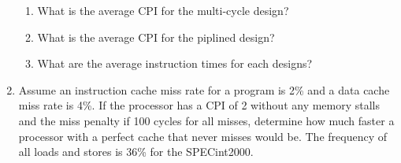\documentclass{article}
\begin{document}
\begin{enumerate}
\begin{enumerate}
\item What is the average CPI for the multi-cycle design?
\item What is the average CPI for the piplined design?
\item What are the average instruction times for each designs?
\end{enumerate}
\item Assume an instruction cache miss rate for a program is 2\% and a data cache miss rate is 4\%.
If the processor has a CPI of 2 without any memory stalls and the miss penalty if 100 cycles for all misses, determine how much faster a processor with a perfect cache that never misses would be.
The frequency of all loads and stores is 36\% for the SPECint2000.
\end{enumerate}
\end{document}
